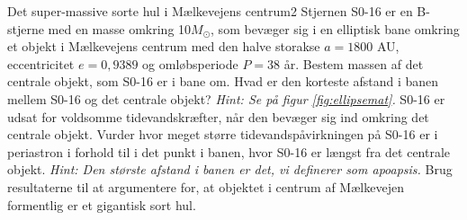 \begin{opgave}{Det super-massive sorte hul i Mælkevejens centrum}{2}
  Stjernen S0-16 er en B-stjerne med en masse omkring 10$M_{\odot}$,
  som bevæger sig i en elliptisk bane omkring et objekt i Mælkevejens
  centrum med den halve storakse $a = 1800$ AU, eccentricitet $e =
  0,9389$ og omløbsperiode $P = 38$ år.  \opg Bestem massen af det
  centrale objekt, som S0-16 er i bane om.  \opg Hvad er den korteste
  afstand i banen mellem S0-16 og det centrale objekt? \emph{Hint: Se
    på figur \ref{fig:ellipsemat}.}  \opg S0-16 er udsat for voldsomme
  tidevandskræfter, når den bevæger sig ind omkring det centrale
  objekt. Vurder hvor meget større tidevandspåvirkningen på S0-16 er i
  periastron i forhold til i det punkt i banen, hvor S0-16 er længst
  fra det centrale objekt. \emph{Hint: Den største afstand i banen er
    det, vi definerer som apoapsis.}  \opg Brug resultaterne til at
  argumentere for, at objektet i centrum af Mælkevejen formentlig er
  et gigantisk sort hul.
\end{opgave}


